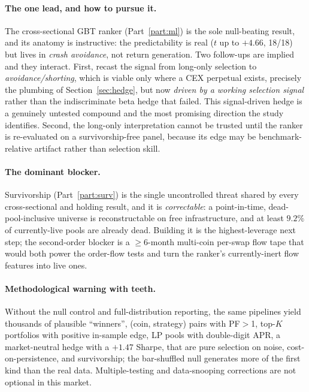 \documentclass[12pt]{article}
\begin{document}
\paragraph{The one lead, and how to pursue it.} The cross-sectional GBT ranker (Part~\ref{part:ml}) is the sole null-beating result, and its anatomy is instructive: the predictability is real ($t$ up to $+4.66$, 18/18) but lives in \emph{crash avoidance}, not return generation. Two follow-ups are implied and they interact. First, recast the signal from long-only selection to \emph{avoidance/shorting}, which is viable only where a CEX perpetual exists, precisely the plumbing of Section~\ref{sec:hedge}, but now \emph{driven by a working selection signal} rather than the indiscriminate beta hedge that failed. This signal-driven hedge is a genuinely untested compound and the most promising direction the study identifies. Second, the long-only interpretation cannot be trusted until the ranker is re-evaluated on a survivorship-free panel, because its edge may be benchmark-relative artifact rather than selection skill.

\paragraph{The dominant blocker.} Survivorship (Part~\ref{part:surv}) is the single uncontrolled threat shared by every cross-sectional and holding result, and it is \emph{correctable}: a point-in-time, dead-pool-inclusive universe is reconstructable on free infrastructure, and at least $9.2\%$ of currently-live pools are already dead. Building it is the highest-leverage next step; the second-order blocker is a $\geq$6-month multi-coin per-swap flow tape that would both power the order-flow tests and turn the ranker's currently-inert flow features into live ones.

\paragraph{Methodological warning with teeth.} Without the null control and full-distribution reporting, the same pipelines yield thousands of plausible ``winners'', (coin, strategy) pairs with PF$>$1, top-$K$ portfolios with positive in-sample edge, LP pools with double-digit APR, a market-neutral hedge with a $+1.47$ Sharpe, that are pure selection on noise, cost-on-persistence, and survivorship; the bar-shuffled null generates more of the first kind than the real data. Multiple-testing and data-snooping corrections \cite{white2000,sullivan1999,bailey2014,harvey2016} are not optional in this market.
\end{document}
